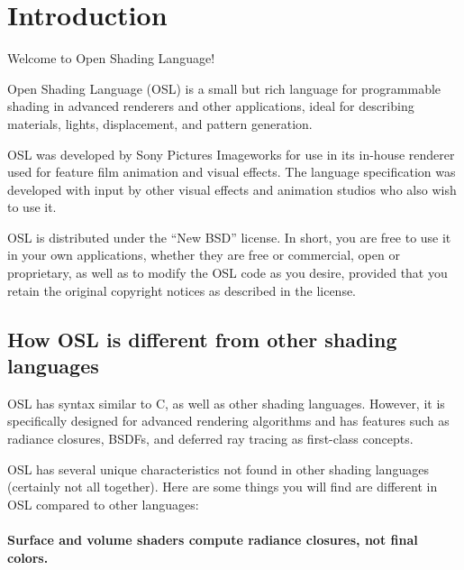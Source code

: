 \documentclass[11pt,letterpaper]{book}
\begin{document}
\newpage




\setcounter{tocdepth}{1}
\tableofcontents

\mainmatter


%


\chapter{Introduction}
\label{chap:intro}


Welcome to Open Shading Language!

\vspace*{0.2in}

Open Shading Language (OSL) is a small but rich language for
programmable shading in advanced renderers and other applications, ideal
for describing materials, lights, displacement, and pattern generation.

OSL was developed by Sony Pictures Imageworks for use in its in-house
renderer used for feature film animation and visual effects. The
language specification was developed with input by other visual effects
and animation studios who also wish to use it.

OSL is distributed under the ``New BSD'' license.  In short, you are free
to use it in your own applications, whether they are free or commercial,
open or proprietary, as well as to modify the OSL code as you desire,
provided that you retain the original copyright notices as described in
the license.


\section*{How OSL is different from other shading languages}

OSL has syntax similar to C, as well as other shading languages.
However, it is specifically designed for advanced rendering algorithms
and has features such as radiance closures, BSDFs, and deferred ray
tracing as first-class concepts.

OSL has several unique characteristics not found in other shading
languages (certainly not all together).  Here are some things you will
find are different in OSL compared to other languages:

\subsubsection*{Surface and volume shaders compute radiance closures, not final colors.}
\end{document}
